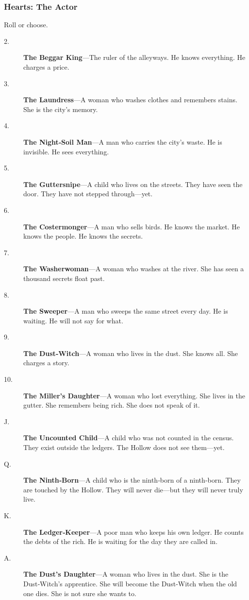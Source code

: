 \documentclass[11pt]{article}
\begin{document}
\subsubsection{Hearts: The Actor}
Roll or choose.

\begin{description}
\item[2.] \textbf{The Beggar King}—The ruler of the alleyways. He knows everything. He charges a price.
\item[3.] \textbf{The Laundress}—A woman who washes clothes and remembers stains. She is the city’s memory.
\item[4.] \textbf{The Night‑Soil Man}—A man who carries the city’s waste. He is invisible. He sees everything.
\item[5.] \textbf{The Guttersnipe}—A child who lives on the streets. They have seen the door. They have not stepped through—yet.
\item[6.] \textbf{The Costermonger}—A man who sells birds. He knows the market. He knows the people. He knows the secrets.
\item[7.] \textbf{The Washerwoman}—A woman who washes at the river. She has seen a thousand secrets float past.
\item[8.] \textbf{The Sweeper}—A man who sweeps the same street every day. He is waiting. He will not say for what.
\item[9.] \textbf{The Dust‑Witch}—A woman who lives in the dust. She knows all. She charges a story.
\item[10.] \textbf{The Miller's Daughter}—A woman who lost everything. She lives in the gutter. She remembers being rich. She does not speak of it.
\item[J.] \textbf{The Uncounted Child}—A child who was not counted in the census. They exist outside the ledgers. The Hollow does not see them—yet.
\item[Q.] \textbf{The Ninth‑Born}—A child who is the ninth‑born of a ninth‑born. They are touched by the Hollow. They will never die—but they will never truly live.
\item[K.] \textbf{The Ledger‑Keeper}—A poor man who keeps his own ledger. He counts the debts of the rich. He is waiting for the day they are called in.
\item[A.] \textbf{The Dust's Daughter}—A woman who lives in the dust. She is the Dust‑Witch’s apprentice. She will become the Dust‑Witch when the old one dies. She is not sure she wants to.
\end{description}
\end{document}
